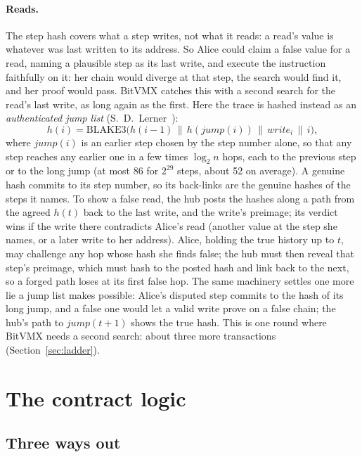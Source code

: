 \documentclass[11pt]{article}
\begin{document}
\paragraph{Reads.} The step hash covers what a step writes, not what it
reads: a read's value is whatever was last written to its address. So
Alice could claim a false value for a read, naming a plausible step as
its last write, and execute the instruction faithfully on it: her chain
would diverge at that step, the search would find it, and her proof
would pass. BitVMX catches this with a second search for the read's last
write, as long again as the first. Here the trace is hashed instead as
an \emph{authenticated jump list} (S.~D.~Lerner~\cite{bitvmxinnov}):
\[
  h(i) = \mathrm{BLAKE3}\big(h(i-1) \,\|\, h(\mathit{jump}(i)) \,\|\,
  \mathit{write}_i \,\|\, i\big),
\]
where $\mathit{jump}(i)$ is an earlier step chosen by the step number
alone, so that any step reaches any earlier one in a few times
$\log_2 n$ hops, each to the previous step or to the long jump (at most
86 for $2^{29}$ steps, about 52 on average). A genuine hash commits to its
step number, so its back-links are the genuine hashes of the steps it
names. To show a false read, the hub posts the hashes along a path from
the agreed $h(t)$ back to the last write, and the write's preimage; its
verdict wins if the write there contradicts Alice's read (another value
at the step she names, or a later write to her address). Alice, holding
the true history up to $t$, may challenge any hop whose hash she finds
false; the hub must then reveal that step's preimage, which must hash to
the posted hash and link back to the next, so a forged path loses at its
first false hop. The same machinery settles one more lie a jump list
makes possible: Alice's disputed step commits to the hash of its long
jump, and a false one would let a valid write prove on a false chain; the
hub's path to $\mathit{jump}(t + 1)$ shows the true hash. This is one
round where BitVMX needs a second search: about three more transactions
(Section~\ref{sec:ladder}).

\section{The contract logic}
\label{sec:contract}

\subsection{Three ways out}
\end{document}
